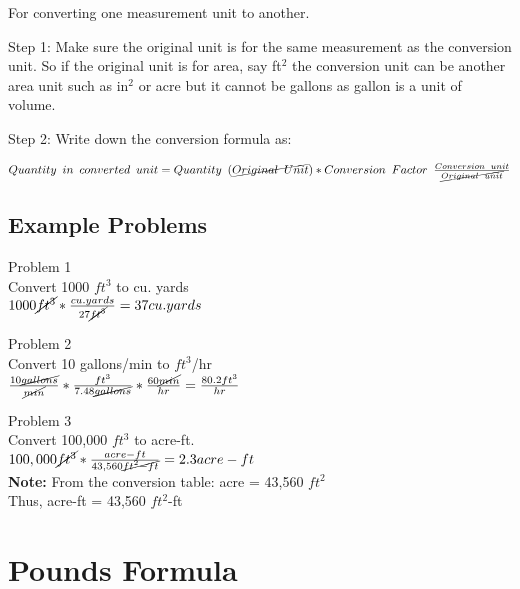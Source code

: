 For converting one measurement unit to another.

Step 1:  Make sure the original unit is for the same measurement as the conversion unit.  So if the original unit is for area, say ft$^2$ the conversion unit can be another area unit such as in$^2$ or acre but it cannot be gallons as gallon is a unit of volume.

Step 2: Write down the conversion formula as:

$Quantity \enspace in \enspace converted \enspace unit = Quantity \enspace (\cancel{Original \enspace Unit}) *   Conversion  \enspace Factor \enspace  \frac{Conversion \enspace unit}{\cancel{Original \enspace unit}}$


\section{Example Problems}
Problem 1\\
Convert 1000 $ft^3$ to cu. yards\\

$1000 \cancel{ft^3}*\frac{cu.yards}{27\cancel{ft^3}} = 37 cu.yards$

Problem 2\\
Convert 10 gallons/min to $ft^3$/hr\\

$\frac{10 \cancel{gallons}}{\cancel{min}}*  \frac{ft^3}{7.48 \cancel{gallons}}  * \frac{60 \cancel{min}}{hr}   = \frac{80.2ft^3}{hr}$


Problem 3\\
Convert 100,000 $ft^3$ to acre-ft.\\
$100,000 \cancel{ft^3} * \frac{acre-ft}{43,560 \cancel{ft^2-ft}} =  2.3 acre-ft$\\
\textbf{Note:} From the conversion table: acre = 43,560 $ft^2$\\
Thus, acre-ft  = 43,560 $ft^2$-ft\\

\chapter{Pounds Formula}


